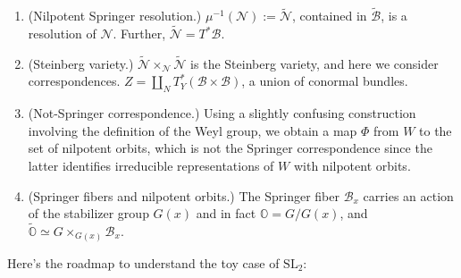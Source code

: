 \begin{enumerate}
\begin{enumerate}
\item (Regular but not semisimple.)
These elements are nilpotent
and lie in a single nilpotent
orbit called the {\it principal orbit}.
The Springer fibers are a single point.

\item (Non-regular nilpotent elements.)
The Springer fiber can be higher dimensional,
like the fiber above zero.
In general the Weyl group does 
not act on these fibers.
\end{enumerate}

\item (Nilpotent Springer resolution.)
$\mu^{-1}(\mathcal{N}):=\widetilde{\mathcal{N}}$,
contained in $\widetilde{\mathcal{B}}$,
is a resolution of $\mathcal{N}$.
Further, $\widetilde{\mathcal{N}}
=T^*\mathcal{B}$.

\item (Steinberg variety.)
$\widetilde{\mathcal{N}}\times_{\mathcal{N}}
\widetilde{\mathcal{N}}$
is the Steinberg variety,
and here we consider correspondences.
$Z = \coprod_{N}
T^*_Y(\mathcal{B} \times \mathcal{B})$,
a union of conormal bundles.

\item (Not-Springer correspondence.)
Using a slightly confusing construction
involving the definition of the Weyl group,
we obtain a map $\Phi$ from $W$ to
the set of nilpotent orbits, which is not
the Springer correspondence since the latter
identifies irreducible representations of $W$
with nilpotent orbits.

\item (Springer fibers and nilpotent orbits.)
The Springer fiber $\mathcal{B}_x$
carries an action of the stabilizer group
$G(x)$ and in fact $\mathbb{O}=G/G(x)$,
and $\tilde{\mathbb{O}} \simeq 
G \times_{G(x)}\mathcal{B}_x$.
\end{enumerate}

\medskip\noindent
Here's the roadmap to understand the
toy case of $\text{SL}_2$:

